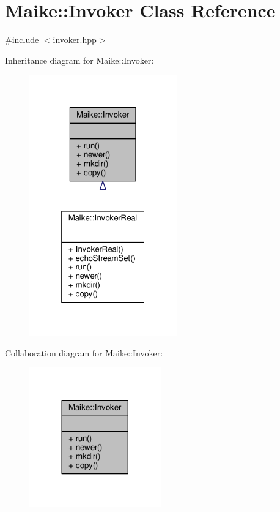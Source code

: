 \hypertarget{class_maike_1_1_invoker}{}\section{Maike\+:\+:Invoker Class Reference}
\label{class_maike_1_1_invoker}


{\ttfamily \#include $<$invoker.\+hpp$>$}



Inheritance diagram for Maike\+:\+:Invoker\+:\nopagebreak
\begin{figure}[H]
\begin{center}
\leavevmode
\includegraphics[width=181pt]{class_maike_1_1_invoker__inherit__graph}
\end{center}
\end{figure}


Collaboration diagram for Maike\+:\+:Invoker\+:\nopagebreak
\begin{figure}[H]
\begin{center}
\leavevmode
\includegraphics[width=161pt]{class_maike_1_1_invoker__coll__graph}
\end{center}
\end{figure}
